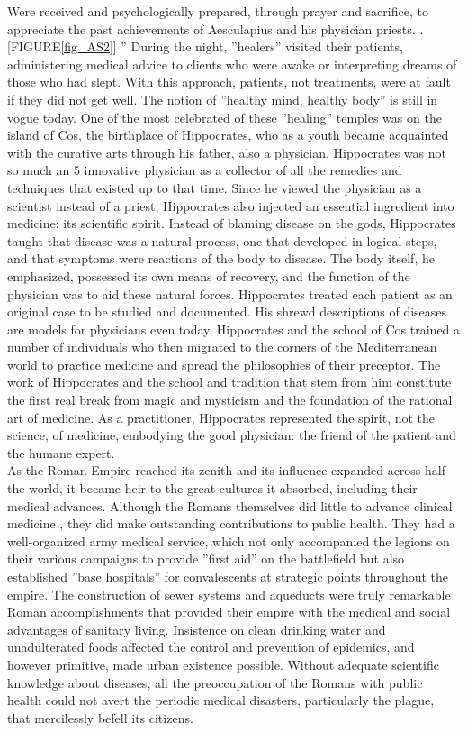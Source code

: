 \documentclass[12pt]{article}
\begin{document}
Were received and psychologically prepared, through prayer and sacrifice, to appreciate the past achievements of Aesculapius and his physician priests.
.[FIGURE\ref{fig_AS2}]
'' During the night, ''healers'' visited their patients, administering medical advice to clients who were awake or interpreting dreams of those who had slept.
With this approach, patients, not treatments, were at fault if they did not get well.
The notion of ''healthy mind, healthy body'' is still in vogue today.
One of the most celebrated of these ''healing'' temples was on the island of Cos, the birthplace of Hippocrates, who as a youth became acquainted with the curative arts through his father, also a physician.
Hippocrates was not so much an 5 innovative physician as a collector of all the remedies and techniques that existed up to that time.
Since he viewed the physician as a scientist instead of a priest, Hippocrates also injected an essential ingredient into medicine: its scientific spirit.
Instead of blaming disease on the gods, Hippocrates taught that disease was a natural process, one that developed in logical steps, and that symptoms were reactions of the body to disease.
The body itself, he emphasized, possessed its own means of recovery, and the function of the physician was to aid these natural forces.
Hippocrates treated each patient as an original case to be studied and documented.
His shrewd descriptions of diseases are models for physicians even today.
Hippocrates and the school of Cos trained a number of individuals who then migrated to the corners of the Mediterranean world to practice medicine and spread the philosophies of their preceptor.
The work of Hippocrates and the school and tradition that stem from him constitute the first real break from magic and mysticism and the foundation of the rational art of medicine.
As a practitioner, Hippocrates represented the spirit, not the science, of medicine, embodying the good physician: the friend of the patient and the humane expert.\\
   
   As the Roman Empire reached its zenith and its influence expanded across half the world, it became heir to the great cultures it absorbed, including their medical advances.
Although the Romans themselves did little to advance clinical medicine , they did make outstanding contributions to public health.
They had a well-organized army medical service, which not only accompanied the legions on their various campaigns to provide ''first aid'' on the battlefield but also established ''base hospitals'' for convalescents at strategic points throughout the empire.
The construction of sewer systems and aqueducts were truly remarkable Roman accomplishments that provided their empire with the medical and social advantages of sanitary living.
Insistence on clean drinking water and unadulterated foods affected the control and prevention of epidemics, and however primitive, made urban existence possible.
Without adequate scientific knowledge about diseases, all the preoccupation of the Romans with public health could not avert the periodic medical disasters, particularly the plague, that mercilessly befell its citizens.
\clearpage
\end{document}
